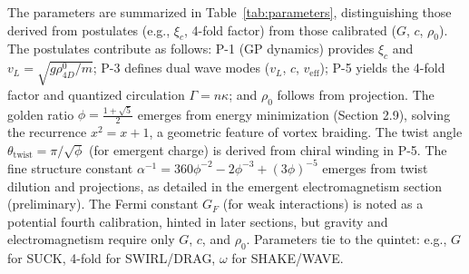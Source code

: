 The parameters are summarized in Table~\ref{tab:parameters}, distinguishing those derived from postulates (e.g., $\xi_c$, 4-fold factor) from those calibrated ($G$, $c$, $\rho_0$). The postulates contribute as follows: P-1 (GP dynamics) provides $\xi_c$ and $v_L = \sqrt{g \rho_{4D}^0 / m}$; P-3 defines dual wave modes ($v_L$, $c$, $v_{\text{eff}}$); P-5 yields the 4-fold factor and quantized circulation $\Gamma = n \kappa$; and $\rho_0$ follows from projection. The golden ratio $\phi = \frac{1 + \sqrt{5}}{2}$ emerges from energy minimization (Section 2.9), solving the recurrence $x^2 = x + 1$, a geometric feature of vortex braiding. The twist angle $\theta_{\text{twist}} = \pi / \sqrt{\phi}$ (for emergent charge) is derived from chiral winding in P-5. The fine structure constant $\alpha^{-1} = 360 \phi^{-2} - 2 \phi^{-3} + (3 \phi)^{-5}$ emerges from twist dilution and projections, as detailed in the emergent electromagnetism section (preliminary). The Fermi constant $G_F$ (for weak interactions) is noted as a potential fourth calibration, hinted in later sections, but gravity and electromagnetism require only $G$, $c$, and $\rho_0$. Parameters tie to the quintet: e.g., $G$ for SUCK, 4-fold for SWIRL/DRAG, $\omega$ for SHAKE/WAVE.

